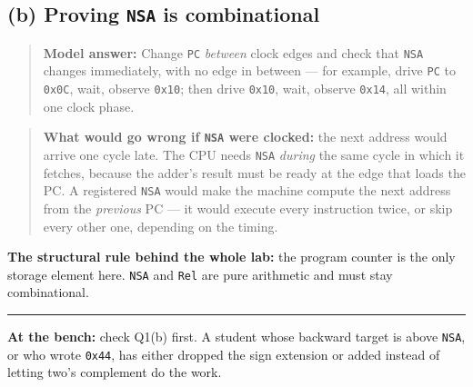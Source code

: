 \documentclass[11pt]{article}
\newcommand{\code}[1]{\texttt{#1}}
\newcommand{\hr}{\vspace{2pt}\hrule\vspace{6pt}}
\begin{document}
\subsection*{(b) Proving \code{NSA} is combinational}

\begin{quote}
\textbf{Model answer:} Change \code{PC} \emph{between} clock edges and check that
\code{NSA} changes immediately, with no edge in between --- for example, drive
\code{PC} to \code{0x0C}, wait, observe \code{0x10}; then drive \code{0x10}, wait,
observe \code{0x14}, all within one clock phase.
\end{quote}

\begin{quote}
\textbf{What would go wrong if \code{NSA} were clocked:} the next address would
arrive one cycle late. The CPU needs \code{NSA} \emph{during} the same cycle in
which it fetches, because the adder's result must be ready at the edge that loads
the PC. A registered \code{NSA} would make the machine compute the next address
from the \emph{previous} PC --- it would execute every instruction twice, or skip
every other one, depending on the timing.
\end{quote}

\textbf{The structural rule behind the whole lab:} the program counter is the only
storage element here. \code{NSA} and \code{Rel} are pure arithmetic and must stay
combinational.

\vspace{6pt}
\hr
{\small \textbf{At the bench:} check Q1(b) first. A student whose backward target
is above \code{NSA}, or who wrote \code{0x44}, has either dropped the sign
extension or added instead of letting two's complement do the work.}
\end{document}
